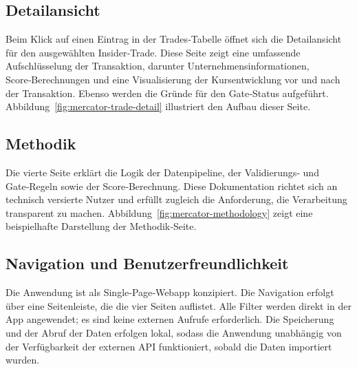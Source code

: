 \subsection{Detailansicht}

Beim Klick auf einen Eintrag in der Trades‑Tabelle öffnet sich die Detailansicht für den ausgewählten Insider‑Trade. Diese Seite zeigt eine umfassende Aufschlüsselung der Transaktion, darunter Unternehmensinformationen, Score‑Berechnungen und eine Visualisierung der Kursentwicklung vor und nach der Transaktion. Ebenso werden die Gründe für den Gate‑Status aufgeführt. Abbildung~\ref{fig:mercator-trade-detail} illustriert den Aufbau dieser Seite.

\subsection{Methodik}

Die vierte Seite erklärt die Logik der Datenpipeline, der Validierungs‑ und Gate‑Regeln sowie der Score‑Berechnung. Diese Dokumentation richtet sich an technisch versierte Nutzer und erfüllt zugleich die Anforderung, die Verarbeitung transparent zu machen. Abbildung~\ref{fig:mercator-methodology} zeigt eine beispielhafte Darstellung der Methodik‑Seite.

\subsection{Navigation und Benutzerfreundlichkeit}

Die Anwendung ist als Single‑Page‑Webapp konzipiert. Die Navigation erfolgt über eine Seitenleiste, die die vier Seiten auflistet. Alle Filter werden direkt in der App angewendet; es sind keine externen Aufrufe erforderlich. Die Speicherung und der Abruf der Daten erfolgen lokal, sodass die Anwendung unabhängig von der Verfügbarkeit der externen API funktioniert, sobald die Daten importiert wurden.